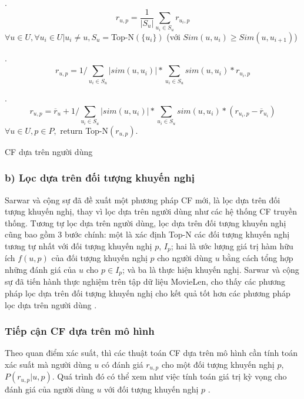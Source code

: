 \begin{algorithm}[H]
\begin{algorithmic}[1]
.
\begin{equation}
\displaystyle r_{u,p} = \frac{1} {|S_{u}|} \sum_{u_{i} \in S_{u }}^{}{r_{u_{i},p}}
\end{equation}
$\forall u \in U, \forall u_{i} \in U | u_{i} \neq u, S_u =  $Top-N$ (\{u_i\})$ (với $Sim(u,u_i) \geq Sim(u,u_{i+1})$)

.
\begin{equation}
\displaystyle  r_{u,p} = 1/\sum_{u_{i} \in S_{u }}|sim(u,u_{i})| * \sum_{u_{i} \in S_{u }}^{}sim(u,u_{i})*r_{u_{i},p}
\end{equation}

. 
\begin{equation}
\displaystyle  r_{u,p}  = \overline{r}_{u} + 1/\sum_{u_{i} \in S_{u }}|sim(u,u_{i})| * \sum_{u_{i} \in S_{u }}^{}sim(u,u_{i})*(r_{u_{i},p} - \overline{r}_{u_{i}})
\end{equation}
\STATE $ \forall u \in U, p \in P,$ return Top-N$(r_{u,p})$.
\end{algorithmic}
\caption{CF dựa trên người dùng}
\end{algorithm}

\subsubsection*{b) Lọc dựa trên đối tượng khuyến nghị}
Sarwar và cộng sự đã đề xuất một phương pháp CF mới, là lọc dựa trên đối tượng khuyến nghị, thay vì lọc dựa trên người dùng như các hệ thống CF truyền thống. Tương tự lọc dựa trên người dùng, lọc dựa trên đối tượng khuyến nghị cũng bao gồm 3 bước chính: một là xác định Top-N các đối tượng khuyến nghị tương tự nhất với đối tượng khuyến nghị $p$, $I_{p}$; hai là ước lượng giá trị hàm hữu ích $f(u,p)$ của đối tượng khuyến nghị $p$ cho người dùng $u$ bằng cách tổng hợp những đánh giá của $u$ cho $p \in I_{p}$; và ba là thực hiện khuyến nghị. Sarwar và cộng sự đã tiến hành thực nghiệm trên tập dữ liệu MovieLen, cho thấy các phương pháp lọc dựa trên đối tượng khuyến nghị cho kết quả tốt hơn các phương pháp lọc dựa trên người dùng \cite{Sarwar:2001:ICF}.

\subsubsection{Tiếp cận CF dựa trên mô hình}
Theo quan điểm xác suất, thì các thuật toán CF dựa trên mô hình cần tính toán xác suất mà người dùng $u$ có đánh giá $r_{u,p}$ cho một đối tượng khuyến nghị $p$, $P(r_{u,p} | u,p)$. Quá trình đó có thể xem như việc tính toán giá trị kỳ vọng cho đánh giá của người dùng $u$ với đối tượng khuyến nghị $p$ \cite{Breese:1998:EAP:2074094.2074100}. 

